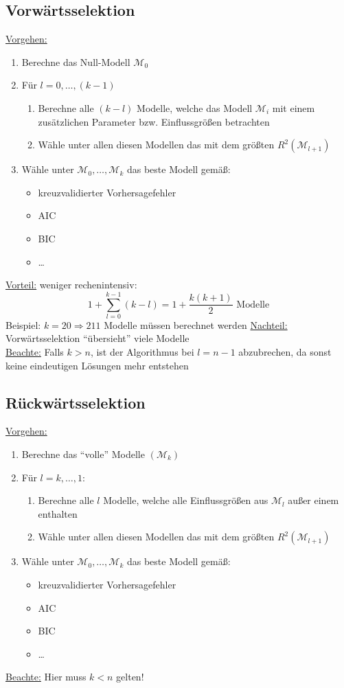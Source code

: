 \documentclass[10pt]{report}
\theoremstyle{definition}
\begin{document}
\subsection{Vorwärtsselektion}
\underline{Vorgehen:} 
\begin{enumerate}
	\item Berechne das Null-Modell $\mathcal{M}_0$
	\item Für $l=0,\dots,(k-1)$
		\begin{enumerate}
			\item Berechne alle $(k-l)$ Modelle, welche das Modell $\mathcal{M}_i$ mit einem zusätzlichen Parameter bzw. Einflussgrößen betrachten
			\item Wähle unter allen diesen Modellen das mit dem größten $R^{2} (\mathcal{M}_{l+1})$
		\end{enumerate}
	\item Wähle unter $\mathcal{M}_0,\dots,\mathcal{M}_k$ das beste Modell gemäß:
		\begin{itemize}
			\item kreuzvalidierter Vorhersagefehler
			\item AIC
			\item BIC
			\item \dots
		\end{itemize}
\end{enumerate}
\underline{Vorteil:} weniger rechenintensiv:
\[ 1 + \sum\limits_{l=0}^{k-1} (k-l)=1+ \frac{k(k+1)}{2} \text{ Modelle}\]
Beispiel: $k=20 \Rightarrow 211$ Modelle müssen berechnet werden
\underline{Nachteil:} Vorwärtsselektion ``übersieht'' viele Modelle  \\
\underline{Beachte:} Falls $k > n$, ist der Algorithmus bei $l=n-1$ abzubrechen, da sonst keine eindeutigen Lösungen mehr entstehen

\subsection{Rückwärtsselektion}
\underline{Vorgehen:}
\begin{enumerate}
	\item Berechne das ``volle'' Modelle $(\mathcal{M}_k)$
	\item Für $l=k,\dots,1:$
		\begin{enumerate}
			\item Berechne alle $l$ Modelle, welche alle Einflussgrößen aus $\mathcal{M}_l$ außer einem enthalten
			\item Wähle unter allen diesen Modellen das mit dem größten $R^{2} (\mathcal{M}_{l+1})$
		\end{enumerate}
	\item Wähle unter $\mathcal{M}_0,\dots,\mathcal{M}_k$ das beste Modell gemäß:
		\begin{itemize}
			\item kreuzvalidierter Vorhersagefehler
			\item AIC
			\item BIC
			\item \dots
		\end{itemize}
\end{enumerate}
\underline{Beachte:} Hier muss $k < n$ gelten!
\end{document}

